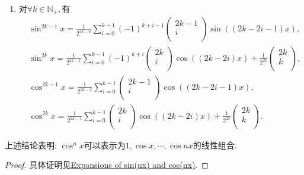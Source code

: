 \documentclass[../../main.tex]{subfiles}%
\begin{document}
\begin{theorem}
\begin{enumerate}
\item 对$\forall k\in \mathbb{N} _+,$有
\begin{align*}
&\sin ^{2k-1}x=\frac{1}{2^{2k-2}}\sum_{i=0}^{k-1}{\left( -1 \right) ^{k+i-1}\left( \begin{array}{c}
2k-1\\
i\\
\end{array} \right) \sin \left( \left( 2k-2i-1 \right) x \right)},
\\
&\sin ^{2k}x=\frac{1}{2^{2k-1}}\sum_{i=0}^{k-1}{\left( -1 \right) ^{k+i}\left( \begin{array}{c}
2k\\
i\\
\end{array} \right) \cos \left( \left( 2k-2i \right) x \right)}+\frac{1}{2^{2k}}\left( \begin{array}{c}
2k\\
k\\
\end{array} \right) ,
\\
&\cos ^{2k-1}x=\frac{1}{2^{2k-2}}\sum_{i=0}^{k-1}{\left( \begin{array}{c}
2k-1\\
i\\
\end{array} \right) \cos \left( \left( 2k-2i-1 \right) x \right)},
\\
&\cos ^{2k}x=\frac{1}{2^{2k-1}}\sum_{i=0}^{k-1}{\left( \begin{array}{c}
2k\\
i\\
\end{array} \right) \cos \left( \left( 2k-2i \right) x \right)}+\frac{1}{2^{2k}}\left( \begin{array}{c}
2k\\
k\\
\end{array} \right) .
\end{align*}

\end{enumerate}
\end{theorem}
\begin{remark}
上述结论表明:
$\cos ^nx$可以表示为$1,\cos x,\cdots,\cos nx$的线性组合.
\end{remark}
\begin{proof}
具体证明见\href{https://brilliant.org/wiki/expansions-of-certain-trigonometric-functions/}{Expansions of sin(nx) and cos(nx)}.





\end{proof}
\end{document}
